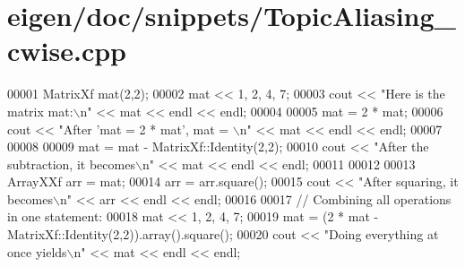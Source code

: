 \hypertarget{eigen_2doc_2snippets_2_topic_aliasing__cwise_8cpp_source}{}\section{eigen/doc/snippets/\+Topic\+Aliasing\+\_\+cwise.cpp}
\label{eigen_2doc_2snippets_2_topic_aliasing__cwise_8cpp_source}

\begin{DoxyCode}
00001 MatrixXf mat(2,2); 
00002 mat << 1, 2,  4, 7;
00003 cout << \textcolor{stringliteral}{"Here is the matrix mat:\(\backslash\)n"} << mat << endl << endl;
00004 
00005 mat = 2 * mat;
00006 cout << \textcolor{stringliteral}{"After 'mat = 2 * mat', mat = \(\backslash\)n"} << mat << endl << endl;
00007 
00008 
00009 mat = mat - MatrixXf::Identity(2,2);
00010 cout << \textcolor{stringliteral}{"After the subtraction, it becomes\(\backslash\)n"} << mat << endl << endl;
00011 
00012 
00013 ArrayXXf arr = mat;
00014 arr = arr.square();
00015 cout << \textcolor{stringliteral}{"After squaring, it becomes\(\backslash\)n"} << arr << endl << endl;
00016 
00017 \textcolor{comment}{// Combining all operations in one statement:}
00018 mat << 1, 2,  4, 7;
00019 mat = (2 * mat - MatrixXf::Identity(2,2)).array().square();
00020 cout << \textcolor{stringliteral}{"Doing everything at once yields\(\backslash\)n"} << mat << endl << endl;
\end{DoxyCode}
